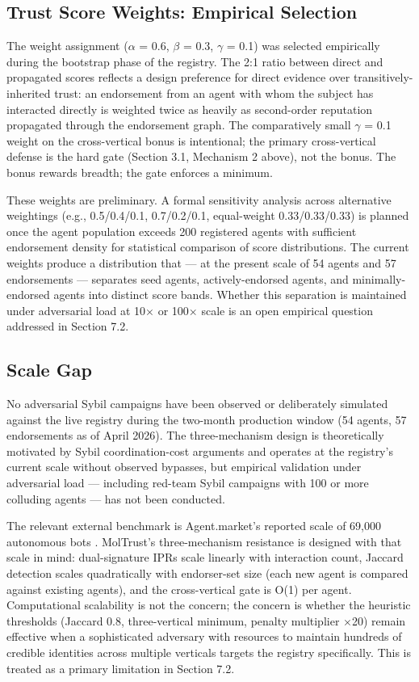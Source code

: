 \subsection{Trust Score Weights: Empirical Selection}

The weight assignment ($\alpha$ = 0.6, $\beta$ = 0.3, $\gamma$ = 0.1) was selected empirically during the bootstrap phase of the registry. The 2:1 ratio between direct and propagated scores reflects a design preference for direct evidence over transitively-inherited trust: an endorsement from an agent with whom the subject has interacted directly is weighted twice as heavily as second-order reputation propagated through the endorsement graph. The comparatively small $\gamma$ = 0.1 weight on the cross-vertical bonus is intentional; the primary cross-vertical defense is the hard gate (Section 3.1, Mechanism 2 above), not the bonus. The bonus rewards breadth; the gate enforces a minimum.


These weights are preliminary. A formal sensitivity analysis across alternative weightings (e.g., 0.5/0.4/0.1, 0.7/0.2/0.1, equal-weight 0.33/0.33/0.33) is planned once the agent population exceeds 200 registered agents with sufficient endorsement density for statistical comparison of score distributions. The current weights produce a distribution that — at the present scale of 54 agents and 57 endorsements — separates seed agents, actively-endorsed agents, and minimally-endorsed agents into distinct score bands. Whether this separation is maintained under adversarial load at 10$\times$ or 100$\times$ scale is an open empirical question addressed in Section 7.2.


\subsection{Scale Gap}

No adversarial Sybil campaigns have been observed or deliberately simulated against the live registry during the two-month production window (54 agents, 57 endorsements as of April 2026). The three-mechanism design is theoretically motivated by Sybil coordination-cost arguments and operates at the registry's current scale without observed bypasses, but empirical validation under adversarial load — including red-team Sybil campaigns with 100 or more colluding agents — has not been conducted.


The relevant external benchmark is Agent.market's reported scale of 69,000 autonomous bots \cite{ref1_agentmarket}. MolTrust's three-mechanism resistance is designed with that scale in mind: dual-signature IPRs scale linearly with interaction count, Jaccard detection scales quadratically with endorser-set size (each new agent is compared against existing agents), and the cross-vertical gate is O(1) per agent. Computational scalability is not the concern; the concern is whether the heuristic thresholds (Jaccard 0.8, three-vertical minimum, penalty multiplier $\times$20) remain effective when a sophisticated adversary with resources to maintain hundreds of credible identities across multiple verticals targets the registry specifically. This is treated as a primary limitation in Section 7.2.


